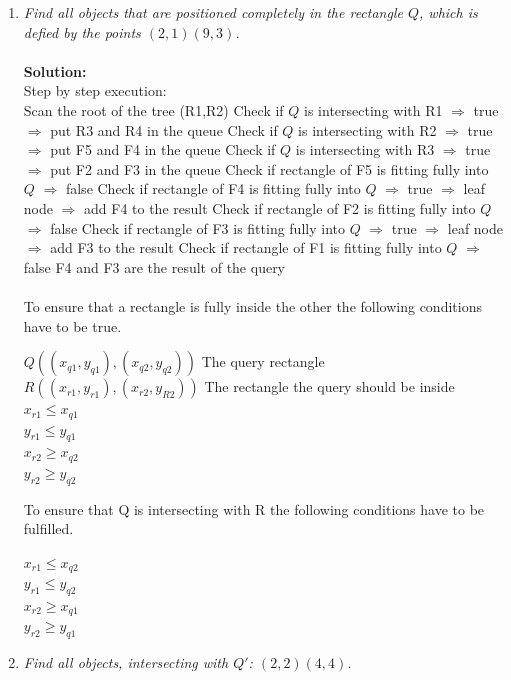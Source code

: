\begin{enumerate}
\item
{\em Find all objects that are positioned completely in the rectangle $Q$, which is defied by the points $(2, 1) (9, 3)$.}\\\\
{\bf Solution:}\\
Step by step execution:\\
  \subitem
  Scan the root of the tree (R1,R2)
  \subitem
  Check if $Q$ is intersecting with R1 $\Rightarrow$ true $\Rightarrow$ put R3 and R4 in the queue
  \subitem
  Check if $Q$ is intersecting with R2 $\Rightarrow$ true $\Rightarrow$ put F5 and F4 in the queue
  \subitem
  Check if $Q$ is intersecting with R3 $\Rightarrow$ true $\Rightarrow$ put F2 and F3 in the queue
  \subitem
  Check if rectangle of F5 is fitting fully into $Q$ $\Rightarrow$ false
  \subitem
  Check if rectangle of F4 is fitting fully into $Q$ $\Rightarrow$ true $\Rightarrow$ leaf node $\Rightarrow$ add F4 to the result
  \subitem
  Check if rectangle of F2 is fitting fully into $Q$ $\Rightarrow$ false
  \subitem
  Check if rectangle of F3 is fitting fully into $Q$ $\Rightarrow$ true $\Rightarrow$ leaf node $\Rightarrow$ add F3 to the result
  \subitem
  Check if rectangle of F1 is fitting fully into $Q$ $\Rightarrow$ false
  {\subitem
  F4 and F3 are the result of the query}\\\\
  To ensure that a rectangle is fully inside the other the following conditions have to be true.
  \begin{center}
    $ Q((x_{q1},y_{q1}),(x_{q2},y_{q2}))$ The query rectangle\\
    $ R((x_{r1},y_{r1}),(x_{r2},y_{R2}))$ The rectangle the query should be inside\\
    $ x_{r1} \leq x_{q1}$\\
    $ y_{r1} \leq y_{q1}$\\
    $ x_{r2} \geq x_{q2}$\\
    $ y_{r2} \geq y_{q2}$\\
  \end{center}
  To ensure that Q is intersecting with R the following conditions have to be fulfilled.
  \begin{center}
    $ x_{r1} \leq x_{q2}$\\
    $ y_{r1} \leq y_{q2}$\\
    $ x_{r2} \geq x_{q1}$\\
    $ y_{r2} \geq y_{q1}$\\
  \end{center}
\item
  {\em Find all objects, intersecting with $Q'$: $(2,2) (4,4)$.}


\end{enumerate}
